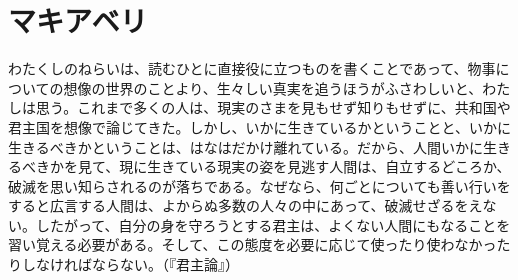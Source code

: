 
\chapter{マキアベリ}


わたくしのねらいは、読むひとに直接役に立つものを書くことであって、物事についての想像の世界のことより、生々しい真実を追うほうがふさわしいと、わたしは思う。これまで多くの人は、現実のさまを見もせず知りもせずに、共和国や君主国を想像で論じてきた。しかし、いかに生きているかということと、いかに生きるべきかということは、はなはだかけ離れている。だから、人間いかに生きるべきかを見て、現に生きている現実の姿を見逃す人間は、自立するどころか、破滅を思い知らされるのが落ちである。なぜなら、何ごとについても善い行いをすると広言する人間は、よからぬ多数の人々の中にあって、破滅せざるをえない。したがって、自分の身を守ろうとする君主は、よくない人間にもなることを習い覚える必要がある。そして、この態度を必要に応じて使ったり使わなかったりしなければならない。（『君主論』）
